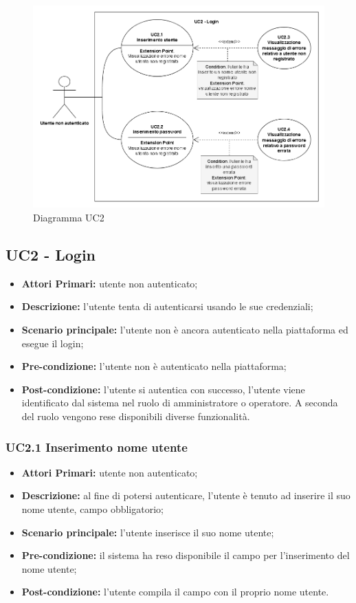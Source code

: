 
 \begin{figure}[h!]
 	\includegraphics[width=17cm]{images/UC2.png}
 	\caption{Diagramma UC2}
 \end{figure}
\subsection{UC2 - Login}
\begin{itemize}
	\item \textbf{Attori Primari:} utente non autenticato;
	\item \textbf{Descrizione:} l'utente tenta di autenticarsi usando le sue credenziali;
	\item \textbf{Scenario principale:} l'utente non è ancora autenticato nella piattaforma ed esegue il login;
	\item \textbf{Pre-condizione:} l'utente non è autenticato nella piattaforma;
	\item \textbf{Post-condizione:} l'utente si autentica con successo, l'utente viene identificato dal sistema nel ruolo di amministratore o operatore. A seconda del ruolo vengono rese disponibili diverse funzionalità.
\end{itemize}

\subsubsection{UC2.1 Inserimento nome utente}
\begin{itemize}
	\item \textbf{Attori Primari:} utente non autenticato;
	\item \textbf{Descrizione:} al fine di potersi autenticare, l'utente è tenuto ad inserire il suo nome utente, campo obbligatorio;
	\item \textbf{Scenario principale:} l'utente inserisce il suo nome utente;
	\item \textbf{Pre-condizione:} il sistema ha reso disponibile il campo per l'inserimento del nome utente;
	\item \textbf{Post-condizione:} l'utente compila il campo con il proprio nome utente.
\end{itemize}	

